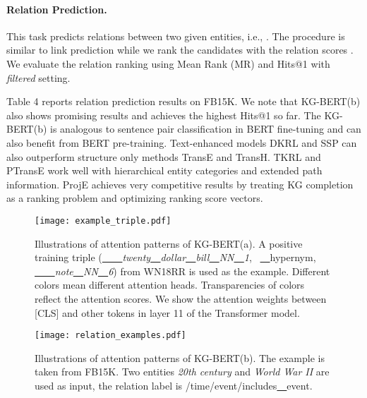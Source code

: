 \documentclass[letterpaper]{article} \usepackage{aaai20}  \usepackage{times}  \usepackage{helvet} \usepackage{courier}  \usepackage[hyphens]{url}  \usepackage{graphicx} \urlstyle{rm} \def\UrlFont{\rm}  \usepackage{graphicx}  \usepackage{amsmath}
\begin{document}
 \paragraph{Relation Prediction.}
This task predicts relations between two given entities, i.e., . The procedure is similar to link prediction while we rank the candidates with the relation scores . We evaluate the relation ranking using Mean Rank (MR) and Hits@1 with \textit{filtered} setting.

Table 4 reports relation prediction results on FB15K. We note that KG-BERT(b) also shows promising results and achieves the highest Hits@1 so far. The KG-BERT(b) is analogous to sentence pair classification in BERT fine-tuning and can also benefit from BERT pre-training. Text-enhanced models DKRL and SSP can also outperform structure only methods TransE and TransH. TKRL and PTransE work well with hierarchical entity categories and extended path information. ProjE achieves very competitive results by treating KG completion as a ranking problem and optimizing ranking score vectors.




\begin{figure}[h]
  \centering
  \texttt{[image: example\_triple.pdf]}
  \caption{Illustrations of attention patterns of KG-BERT(a). A positive training triple (\textit{\underline{~~~~}twenty\underline{~~}dollar\underline{~~}bill\underline{~~}NN\underline{~~}1}, ~\underline{~~}hypernym, \textit{\underline{~~~~}note\underline{~~}NN\underline{~~}6}) from WN18RR is used as the example.  Different colors mean different attention heads. Transparencies of colors reflect the attention scores. We show the attention weights between [CLS] and other tokens in layer 11 of the Transformer model.}
  \label{fig:framework}
\end{figure}

\begin{figure}[h]
  \centering
  \texttt{[image: relation\_examples.pdf]}
  \caption{Illustrations of attention patterns of KG-BERT(b). The example is taken from FB15K. Two entities \textit{20th century} and \textit{World War II} are used as input, the relation label is /time/event/includes\underline{~~}event. }
  \label{fig:framework}
\end{figure}
\end{document}
